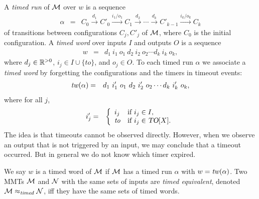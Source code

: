 A \emph{timed run} of ${\mathcal M}$ over $w$ is a sequence 
\begin{eqnarray*}
\alpha & = & C_0 \xrightarrow{d_1} C'_0 \xrightarrow{i_1/o_1} C_1 \xrightarrow{d_2} 
\cdots
\xrightarrow{d_k} C'_{k-1} \xrightarrow{i_k/o_k} C_{k}
\end{eqnarray*}
of transitions between configurations $C_j, C'_j$ of ${\mathcal M}$, where $C_0$ is the initial configuration.
A \emph{timed word} over inputs $I$ and outputs $O$ is a sequence
\begin{eqnarray*}
w & = &  d_1 ~ i_1 ~ o_1 ~ d_2 ~ i_2 ~ o_2 \cdots d_k ~ i_k ~ o_k,
\end{eqnarray*}
where $d_j \in {\mathbb R}^{> 0}$, $i_j \in I \cup \{ \mathit{to} \}$, and $o_j \in O$.
To each timed run $\alpha$ we associate a \emph{timed word} by forgetting the configurations and the timers
in timeout events:
\begin{eqnarray*}
\mathit{tw}(\alpha) & = & d_1 ~ i'_1 ~ o_1 ~ d_2 ~ i'_2 ~ o_2 \cdots d_k ~ i'_k ~ o_k,
\end{eqnarray*}
where for all  $j$,
\begin{eqnarray*}
i'_j  & = &   \left\{ \begin{array}{ll}
i_j & \mbox{if } i_j \in I,\\
\mathit{to} & \mbox{if } i_j \in \mbox{\sl TO}[X].
\end{array} \right.
\end{eqnarray*}
The idea is that timeouts cannot be observed directly. 
However, when we observe an output that is not triggered by an input, we may
conclude that a timeout occurred. But in general we do not know which timer expired.

We say $w$ is a timed word of ${\mathcal M}$ if ${\mathcal M}$ has a timed run $\alpha$ with $w = \mathit{tw}(\alpha)$.
%
Two MMTs ${\mathcal M}$ and ${\mathcal N}$ with the same sets of inputs are \emph{timed equivalent}, denoted ${\mathcal M} \approx_{\mathit{timed}} {\mathcal N}$, iff 
they have the same sets of timed words.

\iflong
